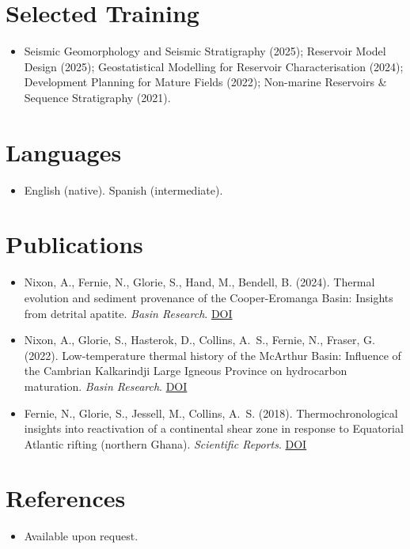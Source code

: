 \documentclass[11pt,a4paper,sans]{moderncv}
\begin{document}
\section{Selected Training}
\vspace{1pt}
\begin{itemize}
\item Seismic Geomorphology and Seismic Stratigraphy (2025); Reservoir Model Design (2025); Geostatistical Modelling for Reservoir Characterisation (2024); Development Planning for Mature Fields (2022); Non-marine Reservoirs \& Sequence Stratigraphy (2021).
\end{itemize}

\section{Languages}
\vspace{1pt}
\begin{itemize}
\item English (native). Spanish (intermediate).
\end{itemize}

\section{Publications}
\vspace{1pt}
\begin{itemize}
\item Nixon, A., Fernie, N., Glorie, S., Hand, M., Bendell, B. (2024). Thermal evolution and sediment provenance of the Cooper-Eromanga Basin: Insights from detrital apatite. \textit{Basin Research}. \href{https://doi.org/10.1111/bre.12843}{DOI}
\item Nixon, A., Glorie, S., Hasterok, D., Collins, A.~S., Fernie, N., Fraser, G. (2022). Low-temperature thermal history of the McArthur Basin: Influence of the Cambrian Kalkarindji Large Igneous Province on hydrocarbon maturation. \textit{Basin Research}. \href{https://doi.org/10.1111/bre.12691}{DOI}
\item Fernie, N., Glorie, S., Jessell, M., Collins, A.~S. (2018). Thermochronological insights into reactivation of a continental shear zone in response to Equatorial Atlantic rifting (northern Ghana). \textit{Scientific Reports}. \href{https://doi.org/10.1038/s41598-018-34769-x}{DOI}
\end{itemize}

\section{References}
\vspace{1pt}
\begin{itemize}
\item{Available upon request.}
\end{itemize}
\end{document}
